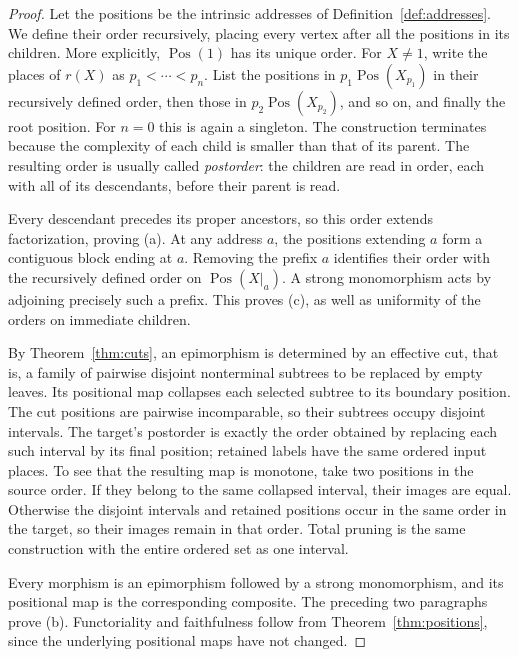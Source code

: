 \documentclass[11pt,a4paper]{article}
\theoremstyle{plain}
\theoremstyle{definition}
\theoremstyle{remark}
\newcommand{\one}{1}
\newcommand{\Pos}{\operatorname{Pos}}
\begin{document}
\begin{proof}
Let the positions be the intrinsic addresses of
Definition~\ref{def:addresses}. We define their order recursively,
placing every vertex after all the positions in its children.
More explicitly, $\Pos(\one)$ has its unique
order. For $X\ne\one$, write the places of $r(X)$ as
$p_1<\cdots<p_n$. List the positions in $p_1\Pos(X_{p_1})$ in
their recursively defined order, then those in
$p_2\Pos(X_{p_2})$, and so on, and finally the root position.
For $n=0$ this is again a singleton. The construction terminates
because the complexity of each child is smaller than that of its
parent. The resulting order is usually called \emph{postorder}:
the children are read in order, each with all of its descendants,
before their parent is read.

Every descendant precedes its proper ancestors, so this order extends
factorization, proving \textup{(a)}. At any address $a$, the positions
extending $a$ form a contiguous block ending at $a$. Removing the
prefix $a$ identifies their order with the recursively defined order
on $\Pos(X|_a)$. A strong monomorphism acts by adjoining precisely
such a prefix. This proves \textup{(c)}, as well as uniformity of the
orders on immediate children.

By Theorem~\ref{thm:cuts}, an epimorphism is determined by an
effective cut, that is, a family of pairwise disjoint nonterminal
subtrees to be replaced by empty leaves. Its positional map
collapses each selected subtree to its boundary
position. The cut positions are pairwise incomparable, so their
subtrees occupy disjoint intervals. The target's postorder is exactly
the order obtained by replacing each such interval by its final
position; retained labels have the same ordered input places.
To see that the resulting map is monotone, take two positions in
the source order. If they belong to the same collapsed interval,
their images are equal. Otherwise the disjoint intervals and
retained positions occur in the same order in the target, so their
images remain in that order. Total pruning is the same construction
with the entire ordered set as one interval.

Every morphism is an epimorphism followed by a strong monomorphism,
and its positional map is the corresponding composite. The preceding
two paragraphs prove \textup{(b)}. Functoriality and faithfulness follow
from Theorem~\ref{thm:positions}, since the underlying positional maps
have not changed.
\end{proof}
\end{document}
